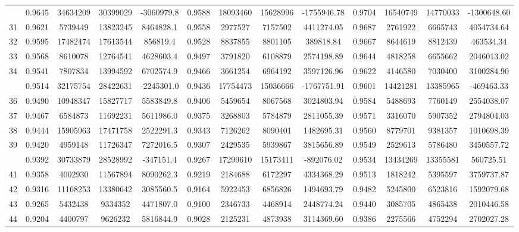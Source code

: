 \documentclass[
  12pt,
]{article}
\begin{document}
\begin{longtable}[t]{lcccccccccccc}
\addlinespace
30 & 0.9645 & 34634209 & 30399029 & -3060979.8 & 0.9588 & 18093460 & 15628996 & -1755946.78 & 0.9704 & 16540749 & 14770033 & -1300648.60\\
31 & 0.9621 & 5739449 & 13823245 & 8464828.1 & 0.9558 & 2977527 & 7157502 & 4411274.05 & 0.9687 & 2761922 & 6665743 & 4054734.64\\
32 & 0.9595 & 17482474 & 17613544 & 856819.4 & 0.9528 & 8837855 & 8801105 & 389818.84 & 0.9667 & 8644619 & 8812439 & 463534.34\\
33 & 0.9568 & 8610078 & 12764541 & 4628603.4 & 0.9497 & 3791820 & 6108879 & 2574198.89 & 0.9644 & 4818258 & 6655662 & 2046013.02\\
34 & 0.9541 & 7807834 & 13994592 & 6702574.9 & 0.9466 & 3661254 & 6964192 & 3597126.96 & 0.9622 & 4146580 & 7030400 & 3100284.90\\
\addlinespace
35 & 0.9514 & 32175754 & 28422631 & -2245301.0 & 0.9436 & 17754473 & 15036666 & -1767751.91 & 0.9601 & 14421281 & 13385965 & -469463.33\\
36 & 0.9490 & 10948347 & 15827717 & 5583849.8 & 0.9406 & 5459654 & 8067568 & 3024803.94 & 0.9584 & 5488693 & 7760149 & 2554038.07\\
37 & 0.9467 & 6584873 & 11692231 & 5611986.0 & 0.9375 & 3268803 & 5784879 & 2811055.39 & 0.9571 & 3316070 & 5907352 & 2794804.03\\
38 & 0.9444 & 15905963 & 17471758 & 2522291.3 & 0.9343 & 7126262 & 8090401 & 1482695.31 & 0.9560 & 8779701 & 9381357 & 1010698.39\\
39 & 0.9420 & 4959148 & 11726347 & 7272016.5 & 0.9307 & 2429535 & 5939867 & 3815656.89 & 0.9549 & 2529613 & 5786480 & 3450557.72\\
\addlinespace
40 & 0.9392 & 30733879 & 28528992 & -347151.4 & 0.9267 & 17299610 & 15173411 & -892076.02 & 0.9534 & 13434269 & 13355581 & 560725.51\\
41 & 0.9358 & 4002930 & 11567894 & 8090262.3 & 0.9219 & 2184688 & 6172297 & 4334368.29 & 0.9513 & 1818242 & 5395597 & 3759737.87\\
42 & 0.9316 & 11168253 & 13380642 & 3085560.5 & 0.9164 & 5922453 & 6856826 & 1494693.79 & 0.9482 & 5245800 & 6523816 & 1592079.68\\
43 & 0.9265 & 5432438 & 9334352 & 4471807.0 & 0.9100 & 2346733 & 4468914 & 2448774.24 & 0.9440 & 3085705 & 4865438 & 2010446.58\\
44 & 0.9204 & 4400797 & 9626232 & 5816844.9 & 0.9028 & 2125231 & 4873938 & 3114369.60 & 0.9386 & 2275566 & 4752294 & 2702027.28\\

\end{longtable}
\end{document}
